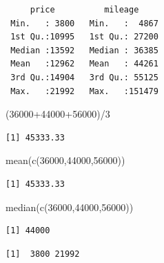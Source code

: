 \documentclass[
  letterpaper,
  DIV=11,
  numbers=noendperiod]{scrartcl}
\newenvironment{Shaded}{\begin{snugshade}}{\end{snugshade}}
\newcommand{\DecValTok}[1]{\textcolor[rgb]{0.68,0.00,0.00}{#1}}
\newcommand{\FunctionTok}[1]{\textcolor[rgb]{0.28,0.35,0.67}{#1}}
\newcommand{\NormalTok}[1]{\textcolor[rgb]{0.00,0.23,0.31}{#1}}
\newcommand{\SpecialCharTok}[1]{\textcolor[rgb]{0.37,0.37,0.37}{#1}}
\begin{document}
\begin{verbatim}
     price          mileage      
 Min.   : 3800   Min.   :  4867  
 1st Qu.:10995   1st Qu.: 27200  
 Median :13592   Median : 36385  
 Mean   :12962   Mean   : 44261  
 3rd Qu.:14904   3rd Qu.: 55125  
 Max.   :21992   Max.   :151479  
\end{verbatim}

\begin{Shaded}
\begin{Highlighting}[]
\NormalTok{(}\DecValTok{36000}\SpecialCharTok{+}\DecValTok{44000}\SpecialCharTok{+}\DecValTok{56000}\NormalTok{)}\SpecialCharTok{/}\DecValTok{3}
\end{Highlighting}
\end{Shaded}

\begin{verbatim}
[1] 45333.33
\end{verbatim}

\begin{Shaded}
\begin{Highlighting}[]
\FunctionTok{mean}\NormalTok{(}\FunctionTok{c}\NormalTok{(}\DecValTok{36000}\NormalTok{,}\DecValTok{44000}\NormalTok{,}\DecValTok{56000}\NormalTok{))}
\end{Highlighting}
\end{Shaded}

\begin{verbatim}
[1] 45333.33
\end{verbatim}

\begin{Shaded}
\begin{Highlighting}[]
\FunctionTok{median}\NormalTok{(}\FunctionTok{c}\NormalTok{(}\DecValTok{36000}\NormalTok{,}\DecValTok{44000}\NormalTok{,}\DecValTok{56000}\NormalTok{))}
\end{Highlighting}
\end{Shaded}

\begin{verbatim}
[1] 44000
\end{verbatim}

\begin{Shaded}
\end{Shaded}

\begin{verbatim}
[1]  3800 21992
\end{verbatim}
\end{document}
